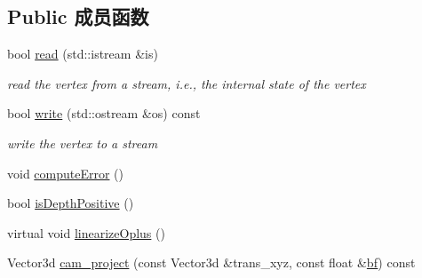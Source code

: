 \subsection*{Public 成员函数}
\begin{DoxyCompactItemize}
\item 
\hypertarget{classg2o_1_1EdgeStereoSE3ProjectXYZ_a59cdc820a694379a73a26d51d948db0e}{bool \hyperlink{classg2o_1_1EdgeStereoSE3ProjectXYZ_a59cdc820a694379a73a26d51d948db0e}{read} (std\-::istream \&is)}\label{classg2o_1_1EdgeStereoSE3ProjectXYZ_a59cdc820a694379a73a26d51d948db0e}

\begin{DoxyCompactList}\small\item\em read the vertex from a stream, i.\-e., the internal state of the vertex \end{DoxyCompactList}\item 
\hypertarget{classg2o_1_1EdgeStereoSE3ProjectXYZ_acda965a32bd3aeb156cbd5883d19e864}{bool \hyperlink{classg2o_1_1EdgeStereoSE3ProjectXYZ_acda965a32bd3aeb156cbd5883d19e864}{write} (std\-::ostream \&os) const }\label{classg2o_1_1EdgeStereoSE3ProjectXYZ_acda965a32bd3aeb156cbd5883d19e864}

\begin{DoxyCompactList}\small\item\em write the vertex to a stream \end{DoxyCompactList}\item 
void \hyperlink{classg2o_1_1EdgeStereoSE3ProjectXYZ_ab60521439da10eabb13f23fe21fbe651}{compute\-Error} ()
\item 
bool \hyperlink{classg2o_1_1EdgeStereoSE3ProjectXYZ_ac176aff8aa08a73f52d7a0f5c3080d4d}{is\-Depth\-Positive} ()
\item 
virtual void \hyperlink{classg2o_1_1EdgeStereoSE3ProjectXYZ_aea04d86a304c6cb4e2a3f34b35166f30}{linearize\-Oplus} ()
\item 
Vector3d \hyperlink{classg2o_1_1EdgeStereoSE3ProjectXYZ_ae5fdd198e102b905c66f0b18c7660767}{cam\-\_\-project} (const Vector3d \&trans\-\_\-xyz, const float \&\hyperlink{classg2o_1_1EdgeStereoSE3ProjectXYZ_afc94291834aa40d18205e61ac802cbfc}{bf}) const 
\end{DoxyCompactItemize}
